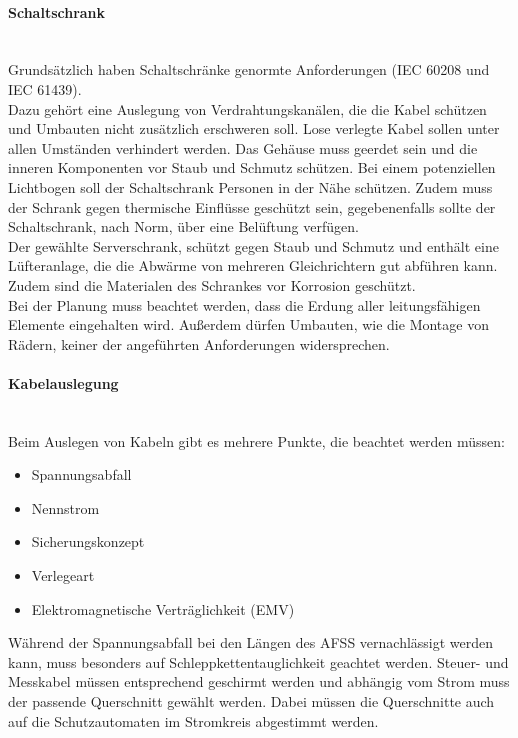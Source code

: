     \paragraph{Schaltschrank}\mbox{}\\
    Grundsätzlich haben Schaltschränke genormte Anforderungen (IEC 60208 und IEC 61439).\\
    Dazu gehört eine Auslegung von Verdrahtungskanälen, die die Kabel schützen und Umbauten nicht zusätzlich erschweren soll. Lose verlegte Kabel sollen unter allen Umständen verhindert werden. Das Gehäuse muss geerdet sein und die inneren Komponenten vor Staub und Schmutz schützen. Bei einem potenziellen Lichtbogen soll der Schaltschrank Personen in der Nähe schützen. Zudem muss der Schrank gegen thermische Einflüsse geschützt sein, gegebenenfalls sollte der Schaltschrank, nach Norm, über eine Belüftung verfügen.\\
    Der gewählte Serverschrank, schützt gegen Staub und Schmutz und enthält eine Lüfteranlage, die die Abwärme von mehreren Gleichrichtern gut abführen kann. Zudem sind die Materialen des Schrankes vor Korrosion geschützt. \cite{Schaltschrank-Anforderungen} \\
    Bei der Planung muss beachtet werden, dass die Erdung aller leitungsfähigen Elemente eingehalten wird. Außerdem dürfen Umbauten, wie die Montage von Rädern, keiner der angeführten Anforderungen widersprechen.

    \paragraph{Kabelauslegung}\mbox{}\\
    Beim Auslegen von Kabeln gibt es mehrere Punkte, die beachtet werden müssen:
    \begin{itemize}
        \item Spannungsabfall
        \item Nennstrom
        \item Sicherungskonzept
        \item Verlegeart
        \item Elektromagnetische Verträglichkeit (EMV)
    \end{itemize} 
    Während der Spannungsabfall bei den Längen des AFSS vernachlässigt werden kann, muss besonders auf Schleppkettentauglichkeit geachtet werden. Steuer- und Messkabel müssen entsprechend geschirmt werden und abhängig vom Strom muss der passende Querschnitt gewählt werden. Dabei müssen die Querschnitte auch auf die Schutzautomaten im Stromkreis abgestimmt werden.\\

